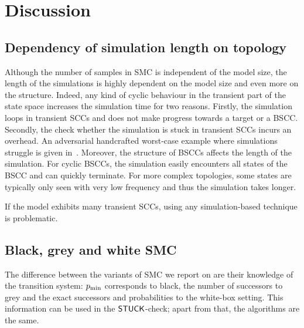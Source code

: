 

\section{Discussion}\label{sec:discussion}


\subsection{Dependency of simulation length on topology}\label{sec:simBad}

Although the number of samples in SMC is independent of the model size, the length of the simulations is highly dependent on the model size and even more on the structure.
Indeed, any kind of cyclic behaviour in the transient part of the state space increases the simulation time for two reasons.
Firstly, the simulation loops in transient SCCs and does not make progress towards a target or a BSCC.
Secondly, the check whether the simulation is stuck in transient SCCs incurs an overhead.
An adversarial handcrafted worst-case example where simulations struggle is given in~\cite[Figure 3]{HM}.
Moreover, the structure of BSCCs affects the length of the simulation. 
For cyclic BSCCs, the simulation easily encounters all states of the BSCC and can quickly terminate.
For more complex topologies, some states are typically only seen with very low frequency and thus the simulation takes longer.

If the model exhibits many transient SCCs, using any simulation-based technique is problematic. 

\subsection{Black, grey and white SMC}

The difference between the variants of SMC we report on are their knowledge of the transition system: $p_{\min}$ corresponds to black, the number of successors to grey and the exact successors and probabilities to the white-box setting.
This information can be used in the $\mathsf{STUCK}$-check; apart from that, the algorithms are the same.



